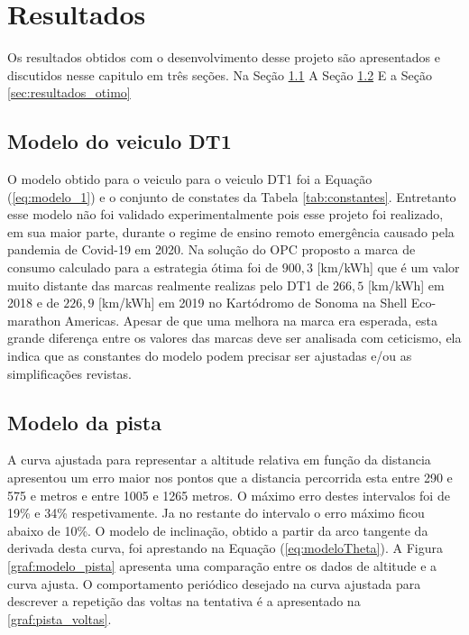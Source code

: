 \chapter{Resultados}
\label{chap:resultados}

Os resultados obtidos com o desenvolvimento desse projeto são apresentados e discutidos nesse capitulo em três seções. 
Na Seção \ref{sec:resultados_modelo} 
A Seção \ref{sec:resultados_pista}
E a Seção \ref{sec:resultados_otimo}

\section{Modelo do veiculo DT1}
\label{sec:resultados_modelo}

O modelo obtido para o veiculo para o veiculo DT1 foi a Equação (\ref{eq:modelo_1}) e o conjunto de constates da Tabela \ref{tab:constantes}.
Entretanto esse modelo não foi validado experimentalmente pois esse projeto foi realizado, em sua maior parte, durante o regime de ensino remoto
emergência causado pela pandemia de Covid-19 em 2020. Na solução do OPC proposto a marca de consumo calculado para a estrategia ótima
foi de $900,3$ [km/kWh] que é um valor muito distante das marcas realmente realizas pelo DT1 de $266,5$ [km/kWh] em 2018 e de $226,9$ [km/kWh] em 2019  no Kartódromo de Sonoma na Shell Eco-marathon Americas. 
Apesar de que uma melhora na marca era esperada, esta grande diferença entre os valores das marcas deve ser analisada com ceticismo, ela indica que as constantes do modelo podem precisar ser ajustadas e/ou as simplificações revistas.


\section{Modelo da pista}
\label{sec:resultados_pista}

A curva ajustada para representar a altitude relativa em função da distancia apresentou um erro maior nos pontos que a distancia percorrida esta entre 290 e 575 e metros e entre 1005 e 1265 metros. O máximo erro destes
intervalos foi de 19\% e 34\% respetivamente. Ja no restante do intervalo o erro máximo ficou abaixo de 10\%. 
O modelo de inclinação, obtido a partir da arco tangente da derivada desta curva, foi aprestando na Equação (\ref{eq:modeloTheta}). 
A Figura \ref{graf:modelo_pista} apresenta uma comparação entre os dados de altitude e a curva ajusta.
O comportamento periódico desejado na curva ajustada para descrever a repetição das voltas na tentativa é a apresentado na \ref{graf:pista_voltas}.


